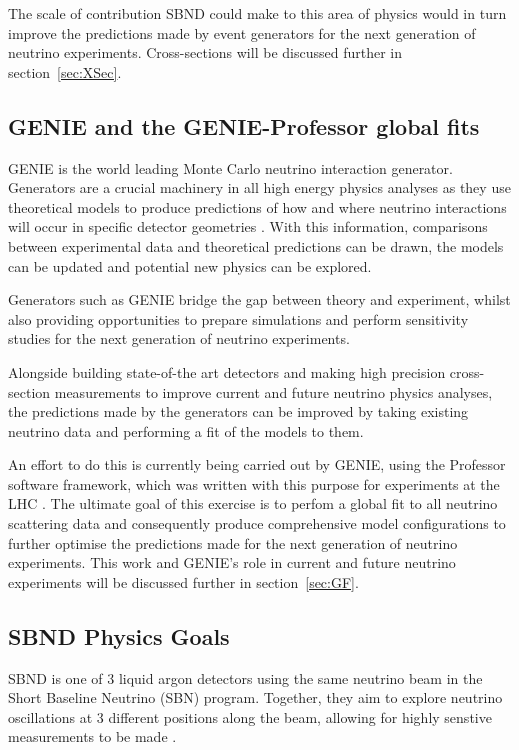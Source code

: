    The scale of contribution SBND could make to this area of physics would in turn improve the predictions made by event generators for the next generation of neutrino experiments. Cross-sections will be discussed further in section~\ref{sec:XSec}.
    
\subsection{GENIE and the GENIE-Professor global fits}

GENIE is the world leading Monte Carlo neutrino interaction generator. Generators are a crucial machinery in all high energy physics analyses as they use theoretical models to produce predictions of how and where neutrino interactions will occur in specific detector geometries \cite{genie}. With this information, comparisons between experimental data and theoretical predictions can be drawn, the models can be updated and potential new physics can be explored.

    Generators such as GENIE bridge the gap between theory and experiment, whilst also providing opportunities to prepare simulations and perform sensitivity studies for the next generation of neutrino experiments.

    Alongside building state-of-the art detectors and making high precision cross-section measurements to improve current and future neutrino physics analyses, the predictions made by the generators can be improved by taking existing neutrino data and performing a fit of the models to them. 

    An effort to do this is currently being carried out by GENIE, using the Professor software framework, which was written with this purpose for experiments at the LHC \cite{prof}. The ultimate goal of this exercise is to perfom a global fit to all neutrino scattering data and consequently produce comprehensive model configurations to further optimise the predictions made for the next generation of neutrino experiments. This work and GENIE's role in current and future neutrino experiments will be discussed further in section~\ref{sec:GF}.

\subsection{SBND Physics Goals}

SBND is one of 3 liquid argon detectors using the same neutrino beam in the Short Baseline Neutrino (SBN) program. Together, they aim to explore neutrino oscillations at 3 different positions along the beam, allowing for highly senstive measurements to be made \cite{sbn}.   

